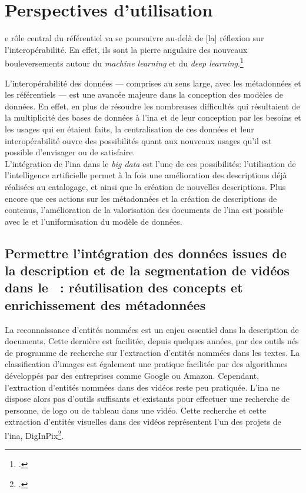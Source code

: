 \section{\label{III-B-3}Perspectives d'utilisation}

\begin{citationLongue}
	[L]e rôle central du référentiel va se poursuivre au-delà de [la] réflexion sur l’interopérabilité. En effet, ils sont la pierre angulaire des nouveaux bouleversements autour du \textit{machine learning} et du \textit{deep learning}.\footcite{poupeau_reflexions_2018}
\end{citationLongue}

L'interopérabilité des données --- comprises au sens large, avec les métadonnées et les référentiels --- est une avancée majeure dans la conception des modèles de données. En effet, en plus de résoudre les nombreuses difficultés qui résultaient de la multiplicité des bases de données à l'\ac{ina} et de leur conception par les besoins et les usages qui en étaient faits, la centralisation de ces données et leur interopérabilité ouvre des possibilités quant aux nouveaux usages qu'il est possible d'envisager ou de satisfaire.\\

L'intégration de l'\ac{ina} dans le \textit{big data} est l'une de ces possibilités: l'utilisation de l'intelligence artificielle permet à la fois une amélioration des descriptions déjà réalisées au catalogage, et ainsi que la création de nouvelles descriptions. Plus encore que ces actions sur les métadonnées et la création de descriptions de contenus, l'amélioration de la valorisation des documents de l'\ac{ina} est possible avec le \ldd et l'uniformisation du modèle de données.

\subsection{\label{III-B-3-a}Permettre l’intégration des données issues de la description et de la segmentation de vidéos dans le \ldd : réutilisation des concepts et enrichissement des métadonnées}
	
La reconnaissance d'entités nommées est un enjeu essentiel dans la description de documents. Cette dernière est facilitée, depuis quelques années, par des outils nés de programme de recherche sur l'extraction d'entités nommées dans les textes. La classification d'images est également une pratique facilitée par des algorithmes développés par des entreprises comme Google ou Amazon. Cependant, l'extraction d'entités nommées dans des vidéos reste peu pratiquée. L'\ac{ina} ne dispose alors pas d'outils suffisants et existants pour effectuer une recherche de personne, de logo ou de tableau dans une vidéo. Cette recherche et cette extraction d'entités visuelles dans des vidéos représentent l'un des projets de l'\ac{ina}, DigInPix\footcite{institut_national_de_laudiovisuel_diginpix_nodate-1}.\\

